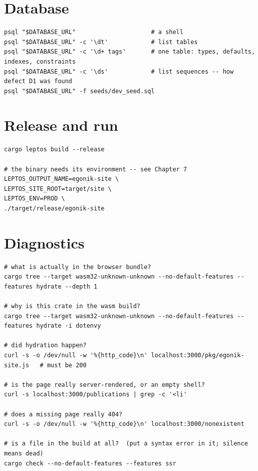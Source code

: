 \section{Database}

\begin{lstlisting}[style=sh]
psql "$DATABASE_URL"                     # a shell
psql "$DATABASE_URL" -c '\dt'            # list tables
psql "$DATABASE_URL" -c '\d+ tags'       # one table: types, defaults, indexes, constraints
psql "$DATABASE_URL" -c '\ds'            # list sequences -- how defect D1 was found
psql "$DATABASE_URL" -f seeds/dev_seed.sql
\end{lstlisting}

\section{Release and run}

\begin{lstlisting}[style=sh]
cargo leptos build --release

# the binary needs its environment -- see Chapter 7
LEPTOS_OUTPUT_NAME=egonik-site \
LEPTOS_SITE_ROOT=target/site \
LEPTOS_ENV=PROD \
./target/release/egonik-site
\end{lstlisting}

\section{Diagnostics}

\begin{lstlisting}[style=sh]
# what is actually in the browser bundle?
cargo tree --target wasm32-unknown-unknown --no-default-features --features hydrate --depth 1

# why is this crate in the wasm build?
cargo tree --target wasm32-unknown-unknown --no-default-features --features hydrate -i dotenvy

# did hydration happen?
curl -s -o /dev/null -w '%{http_code}\n' localhost:3000/pkg/egonik-site.js   # must be 200

# is the page really server-rendered, or an empty shell?
curl -s localhost:3000/publications | grep -c '<li'

# does a missing page really 404?
curl -s -o /dev/null -w '%{http_code}\n' localhost:3000/nonexistent

# is a file in the build at all?  (put a syntax error in it; silence means dead)
cargo check --no-default-features --features ssr
\end{lstlisting}

